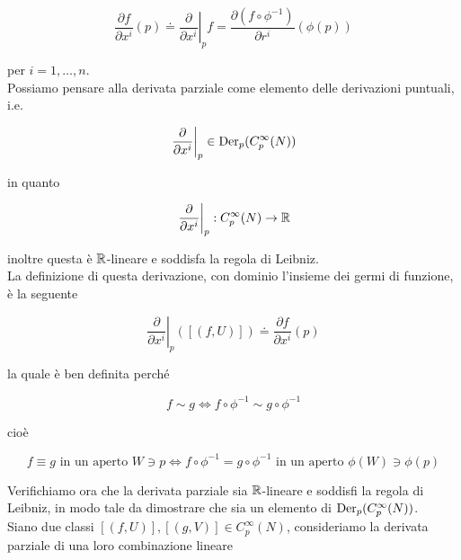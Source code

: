 \begin{equation}
	\dfrac{\partial f}{\partial x^{i}} (p) \doteq \left. \dfrac{\partial}{\partial x^{i}} \right|_{p} f = \dfrac{\partial (f \circ \phi^{-1})}{\partial r^{i}} (\phi(p))
\end{equation}

per $ i=1,\dots,n $.\\
Possiamo pensare alla derivata parziale come elemento delle derivazioni puntuali, i.e.

\begin{equation}
	\left. \dfrac{\partial}{\partial x^{i}} \right|_{p} \in \operatorname{Der}_{p}(C_{p}^{\infty}(N))
\end{equation}

in quanto

\begin{equation}
	\left. \dfrac{\partial}{\partial x^{i}} \right|_{p} : C_{p}^{\infty}(N) \to \mathbb{R}
\end{equation}

inoltre questa è $ \mathbb{R} $-lineare e soddisfa la regola di Leibniz.\\
La definizione di questa derivazione, con dominio l'insieme dei germi di funzione, è la seguente

\begin{equation}
	\left. \dfrac{\partial}{\partial x^{i}} \right|_{p} ([(f,U)]) \doteq \dfrac{\partial f}{\partial x^{i}} (p)
\end{equation}

la quale è ben definita perché

\begin{equation}
	f \sim g \iff f \circ \phi^{-1} \sim g \circ \phi^{-1}
\end{equation}

cioè

\begin{equation}
	 f \equiv g \text{ in un aperto } W \ni p \iff f \circ \phi^{-1} = g \circ \phi^{-1} \text{ in un aperto } \phi(W) \ni \phi(p)
\end{equation}

Verifichiamo ora che la derivata parziale sia $ \mathbb{R} $-lineare e soddisfi la regola di Leibniz, in modo tale da dimostrare che sia un elemento di $ \operatorname{Der}_{p}(C_{p}^{\infty}(N)) $.\\
Siano due classi $ [(f,U)],[(g,V)] \in C_{p}^{\infty}(N) $, consideriamo la derivata parziale di una loro combinazione lineare

